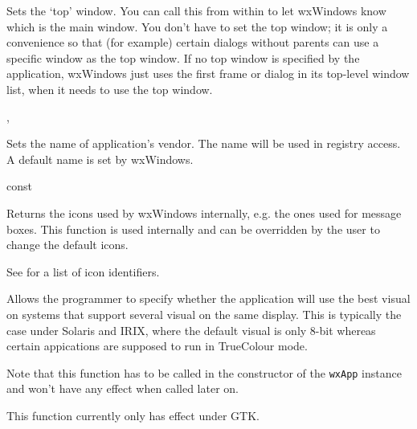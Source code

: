 \label{wxappsettopwindow}


Sets the `top' window. You can call this from within  to
let wxWindows know which is the main window. You don't have to set the top window;
it is only a convenience so that (for example) certain dialogs without parents can use a
specific window as the top window. If no top window is specified by the application,
wxWindows just uses the first frame or dialog in its top-level window list, when it
needs to use the top window.




, 


\label{wxappsetvendorname}


Sets the name of application's vendor. The name will be used
in registry access. A default name is set by
wxWindows.



\label{wxappgetstdicon}

 const

Returns the icons used by wxWindows internally, e.g. the ones used for 
message boxes.  This function is used internally and 
can be overridden by the user to change the default icons.



See  for a list of icon identifiers.

\label{wxappsetusebestvisual}


Allows the programmer to specify whether the application will use the best visual
on systems that support several visual on the same display. This is typically the
case under Solaris and IRIX, where the default visual is only 8-bit whereas certain
appications are supposed to run in TrueColour mode.

Note that this function has to be called in the constructor of the {\tt wxApp} 
instance and won't have any effect when called later on.

This function currently only has effect under GTK.



